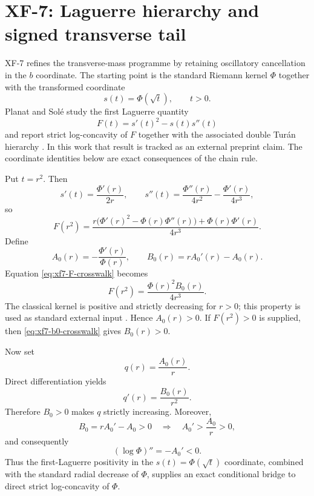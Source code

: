 \section{XF-7: Laguerre hierarchy and signed transverse tail}
\label{sec:xf7-laguerre-signed-tail}

XF-7 refines the transverse-mass programme by retaining oscillatory
cancellation in the $b$ coordinate.  The starting point is the standard
Riemann kernel $\Phi$ together with the transformed coordinate
\begin{equation}
s(t)=\Phi(\sqrt t),\qquad t>0.
\end{equation}
Planat and Solé study the first Laguerre quantity
\begin{equation}
F(t)=s'(t)^2-s(t)s''(t)
\end{equation}
and report strict log-concavity of $F$ together with the associated double
Turán hierarchy \cite{PlanatSole2026Second}.  In this work that result is
tracked as an external preprint claim.  The coordinate identities below are
exact consequences of the chain rule.

Put $t=r^2$. Then
\begin{equation}
s'(t)=\frac{\Phi'(r)}{2r},
\qquad
s''(t)=\frac{\Phi''(r)}{4r^2}-\frac{\Phi'(r)}{4r^3},
\end{equation}
so
\begin{equation}
F(r^2)=
\frac{r\bigl(\Phi'(r)^2-\Phi(r)\Phi''(r)\bigr)
+\Phi(r)\Phi'(r)}{4r^3}.
\label{eq:xf7-F-crosswalk}
\end{equation}
Define
\begin{equation}
A_0(r)=-\frac{\Phi'(r)}{\Phi(r)},
\qquad
B_0(r)=rA_0'(r)-A_0(r).
\end{equation}
Equation \eqref{eq:xf7-F-crosswalk} becomes
\begin{equation}
\boxed{
F(r^2)=\frac{\Phi(r)^2 B_0(r)}{4r^3}.
}
\label{eq:xf7-b0-crosswalk}
\end{equation}
The classical kernel is positive and strictly decreasing for $r>0$; this
property is used as standard external input \cite{Planat2026Theta}.  Hence
$A_0(r)>0$.  If $F(r^2)>0$ is supplied, then \eqref{eq:xf7-b0-crosswalk}
gives $B_0(r)>0$.

Now set
\begin{equation}
q(r)=\frac{A_0(r)}{r}.
\end{equation}
Direct differentiation yields
\begin{equation}
\boxed{
q'(r)=\frac{B_0(r)}{r^2}.
}
\label{eq:xf7-qprime}
\end{equation}
Therefore $B_0>0$ makes $q$ strictly increasing.  Moreover,
\begin{equation}
B_0=rA_0'-A_0>0
\quad\Longrightarrow\quad
A_0'>\frac{A_0}{r}>0,
\end{equation}
and consequently
\begin{equation}
(\log\Phi)''=-A_0'<0.
\end{equation}
Thus the first-Laguerre positivity in the $s(t)=\Phi(\sqrt t)$ coordinate,
combined with the standard radial decrease of $\Phi$, supplies an exact
conditional bridge to direct strict log-concavity of $\Phi$.


